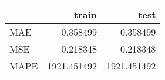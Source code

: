 \begin{tabular}{lrr}
\toprule
{} &        train &         test \\
\midrule
MAE  &     0.358499 &     0.358499 \\
MSE  &     0.218348 &     0.218348 \\
MAPE &  1921.451492 &  1921.451492 \\
\bottomrule
\end{tabular}
